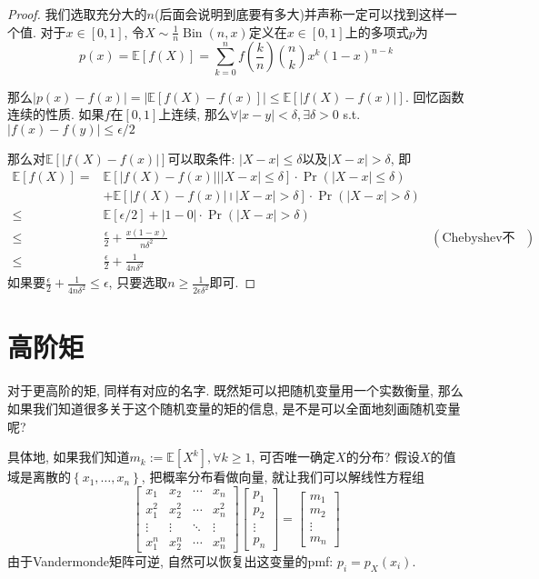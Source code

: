 \documentclass{ctexart}
\begin{document}
\begin{proof}
    我们选取充分大的$n$(后面会说明到底要有多大)并声称一定可以找到这样一个值. 
    对于$x \in[0,1]$, 令$X \sim \frac{1}{n} \operatorname{Bin}(n, x)$定义在$x\in [0, 1]$上的多项式$p$为
$$p(x)=\mathbb{E}[f(X)]=\sum_{k=0}^n f\left(\frac{k}{n}\right)\binom{n}{k} x^k(1-x)^{n-k}$$

那么$|p(x)-f(x)|=|\mathbb{E}[f(X)-f(x)]| \leq \mathbb{E}[|f(X)-f(x)|]$. 
回忆函数连续的性质. 如果$f$在$[0,1]$上连续, 那么$\forall |x-y|<\delta, \exists \delta>0$ s.t. $|f(x)-f(y)| \leq \epsilon / 2$

那么对$\mathbb{E}[|f(X)-f(x)|]$可以取条件: $|X-x|\leq \delta$以及$|X-x|>\delta$, 即
\[
\begin{aligned} \mathbb{E}[f(X)]= & \mathbb{E}[|f(X)-f(x)|||X-x\mid\leq\delta]\cdot\operatorname{Pr}(|X-x|\leq\delta)\\
 & +\mathbb{E}[|f(X)-f(x)|{।}|X-x|>\delta]\cdot\operatorname{Pr}(|X-x|>\delta)\\
\leq & \mathbb{E}[\epsilon/2]+|1-0|\cdot\operatorname{Pr}(|X-x|>\delta)\\
\leq & \frac{\epsilon}{2}+\frac{x(1-x)}{n\delta^{2}} & (\text{Chebyshev不等式})\\
\leq & \frac{\epsilon}{2}+\frac{1}{4n\delta^{2}}
\end{aligned}
\]
如果要$\frac{\epsilon}{2}+\frac{1}{4 n \delta^2} \leq \epsilon$, 只要选取$n \geq \frac{1}{2 \epsilon \delta^2}$即可. 

\end{proof}

\section{高阶矩} 对于更高阶的矩, 同样有对应的名字. 既然矩可以把随机变量用一个实数衡量, 那么如果我们知道很多关于这个随机变量的矩的信息, 是不是可以全面地刻画随机变量呢? 

具体地, 如果我们知道$m_k:=\mathbb{E}\left[X^k\right], \forall k \geq 1$, 可否唯一确定$X$的分布? 
假设$X$的值域是离散的$\left\{x_1, \ldots, x_n\right\}$, 把概率分布看做向量, 就让我们可以解线性方程组
$$
\left[\begin{array}{cccc}
x_1 & x_2 & \cdots & x_n \\
x_1^2 & x_2^2 & \cdots & x_n^2 \\
\vdots & \vdots & \ddots & \vdots \\
x_1^n & x_2^n & \cdots & x_n^n
\end{array}\right]\left[\begin{array}{c}
p_1 \\
p_2 \\
\vdots \\
p_n
\end{array}\right]=\left[\begin{array}{c}
m_1 \\
m_2 \\
\vdots \\
m_n
\end{array}\right]
$$
由于Vandermonde矩阵可逆, 自然可以恢复出这变量的pmf: $p_i=p_X\left(x_i\right)$.
\end{document}

